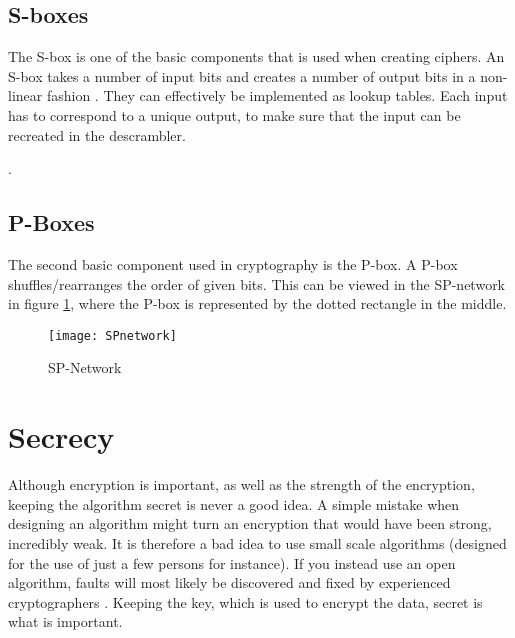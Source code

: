 \subsection{S-boxes}
The S-box is one of the basic components that is used when creating ciphers. 
An S-box takes a number of input bits and creates a number of output bits in 
a non-linear fashion \citep[pp. 74--75]{Stinson:2006}. They can effectively be 
implemented as lookup tables. Each input has to correspond to a unique output, 
to make sure that the input can be recreated in the descrambler.

. 


\subsection{P-Boxes}
The second basic component used in cryptography is the P-box. A P-box 
shuffles/rearranges the order of given bits. This can be viewed in the 
SP-network in figure \ref{img:SPNetwork}, where the P-box is represented by the 
dotted rectangle in the middle.

\begin{figure}
  \begin{center}
    \texttt{[image: SPnetwork]}
    \caption{SP-Network}
    \label{img:SPNetwork}
  \end{center}
\end{figure}


\section{Secrecy}
Although encryption is important, as well as the strength of the encryption, 
keeping the algorithm secret is never a good idea. A simple mistake when 
designing an algorithm might turn an encryption that would have been strong,
incredibly weak. It is therefore a bad idea to use small scale algorithms  
(designed for the use of just a few persons for instance). If you instead 
use an open algorithm, faults will most likely be discovered and fixed by 
experienced cryptographers \citep[pp. 23]{Schneier:2003}. Keeping the key, 
which is used to encrypt the data, secret is what is important.
